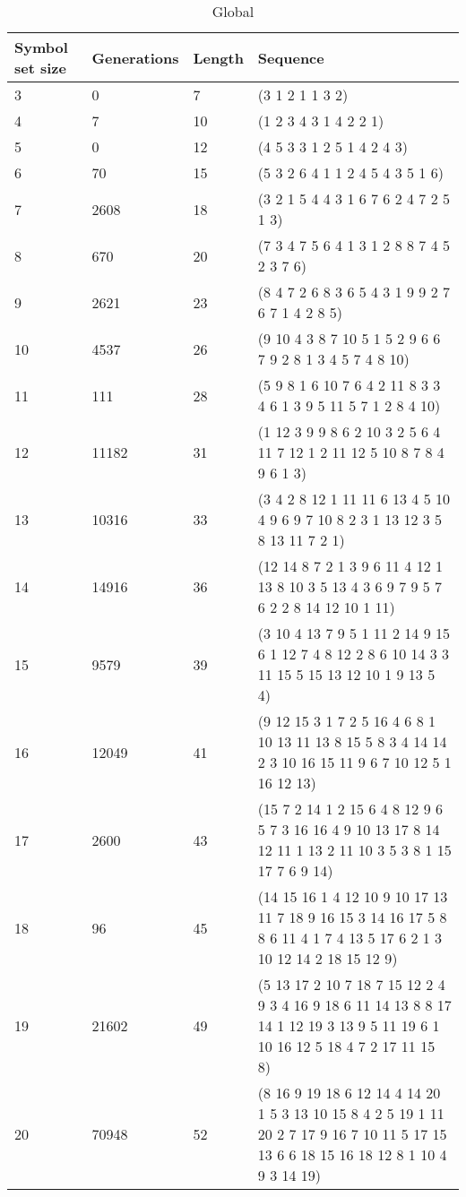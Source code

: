 \begin{table}
\tiny
\begin{tabularx}{\textwidth}{| X | X | X | p{13cm} |}
\hline
Symbol set size &
Generations &
Length &
Sequence \\
\hline
3 & 0 & 7 & (3 1 2 1 1 3 2) \\
4 & 7 & 10 & (1 2 3 4 3 1 4 2 2 1) \\
5 & 0 & 12 & (4 5 3 3 1 2 5 1 4 2 4 3) \\
6 & 70 & 15 & (5 3 2 6 4 1 1 2 4 5 4 3 5 1 6) \\
7 & 2608 & 18 & (3 2 1 5 4 4 3 1 6 7 6 2 4 7 2 5 1 3) \\
8 & 670 & 20 & (7 3 4 7 5 6 4 1 3 1 2 8 8 7 4 5 2 3 7 6) \\
9 & 2621 & 23 & (8 4 7 2 6 8 3 6 5 4 3 1 9 9 2 7 6 7 1 4 2 8 5) \\
10 & 4537 & 26 & (9 10 4 3 8 7 10 5 1 5 2 9 6 6 7 9 2 8 1 3 4 5 7 4 8 10) \\
11 & 111 & 28 & (5 9 8 1 6 10 7 6 4 2 11 8 3 3 4 6 1 3 9 5 11 5 7 1 2 8 4 10) \\
12 & 11182 & 31 & (1 12 3 9 9 8 6 2 10 3 2 5 6 4 11 7 12 1 2 11 12 5 10 8 7 8 4 9 6 1 3) \\
13 & 10316 & 33 & (3 4 2 8 12 1 11 11 6 13 4 5 10 4 9 6 9 7 10 8 2 3 1 13 12 3 5 8 13 11 7 2 1) \\
14 & 14916 & 36 & (12 14 8 7 2 1 3 9 6 11 4 12 1 13 8 10 3 5 13 4 3 6 9 7 9 5 7 6 2 2 8 14 12 10 1 11) \\
15 & 9579 & 39 & (3 10 4 13 7 9 5 1 11 2 14 9 15 6 1 12 7 4 8 12 2 8 6 10 14 3 3 11 15 5 15 13 12 10 1 9 13 5 4) \\
16 & 12049 & 41 & (9 12 15 3 1 7 2 5 16 4 6 8 1 10 13 11 13 8 15 5 8 3 4 14 14 2 3 10 16 15 11 9 6 7 10 12 5 1 16 12 13) \\
17 & 2600 & 43 & (15 7 2 14 1 2 15 6 4 8 12 9 6 5 7 3 16 16 4 9 10 13 17 8 14 12 11 1 13 2 11 10 3 5 3 8 1 15 17 7 6 9 14) \\
18 & 96 & 45 & (14 15 16 1 4 12 10 9 10 17 13 11 7 18 9 16 15 3 14 16 17 5 8 8 6 11 4 1 7 4 13 5 17 6 2 1 3 10 12 14 2 18 15 12 9) \\
19 & 21602 & 49 & (5 13 17 2 10 7 18 7 15 12 2 4 9 3 4 16 9 18 6 11 14 13 8 8 17 14 1 12 19 3 13 9 5 11 19 6 1 10 16 12 5 18 4 7 2 17 11 15 8) \\
20 & 70948 & 52 & (8 16 9 19 18 6 12 14 4 14 20 1 5 3 13 10 15 8 4 2 5 19 1 11 20 2 7 17 9 16 7 10 11 5 17 15 13 6 6 18 15 16 18 12 8 1 10 4 9 3 14 19) \\
\hline
\end{tabularx}
\caption{Global}
\end{table}

